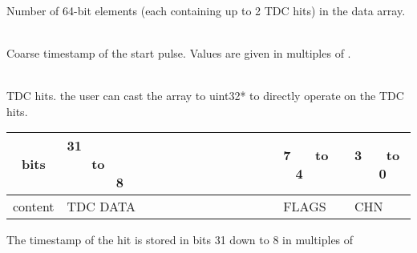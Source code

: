 	\\
	Number of 64-bit elements (each containing up to 2 TDC hits) in the data array.\par

	\\
	Coarse timestamp of the start pulse. Values are given in multiples of .\par

	\\
	TDC hits. the user can cast the array to uint32* to directly operate on the TDC hits.

	\noindent
	\begin{small}
	\begin{tabular}{|c||p{9cm}|p{}|p{}|}
		\hline
		bits & 31~ ~ ~ ~ ~ ~ ~ ~ ~ ~ ~ ~ ~ ~ ~ ~ ~ to ~ ~ ~ ~ ~ ~ ~ ~ ~ ~ ~ ~ ~ ~ ~ ~ ~ 8 & 7~ ~ to ~ ~ 4 & 3~ ~ to ~ ~ 0\\\hline
		content & TDC DATA & FLAGS & CHN \\\hline
	\end{tabular}
	\end{small}

	The timestamp of the hit is stored in bits 31 down to 8 in multiples of 
	\\
	

